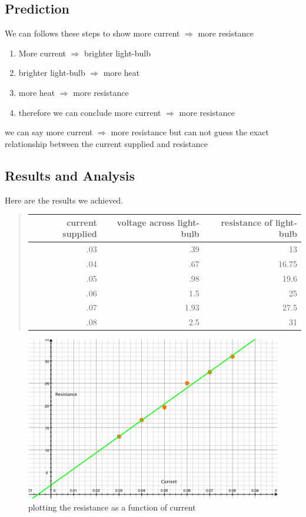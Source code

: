 \documentclass[12pt]{article}
\begin{document}
\subsection*{Prediction}
We can follows these steps to show more current $\Rightarrow$ more resistance

\begin{enumerate}
\item 
More current $\Rightarrow$ brighter light-bulb
\item 
brighter light-bulb $\Rightarrow$ more heat
\item 
more heat  $\Rightarrow$ more resistance
\item 
therefore we can conclude more current $\Rightarrow$ more resistance  
\end{enumerate}
we can say more current $\Rightarrow$ more resistance but can not guess the exact relationship between the current supplied and resistance


\subsection*{Results and Analysis}
Here are the results we achieved.  
\begin{quote}
	\begin{tabular}{|r|r|r|}
	\hline 
	current supplied & voltage across light-bulb & resistance of light-bulb \\
	\hline 
	.03 & .39 & 13 \\
	.04 & .67 & 16.75 \\
	.05 & .98 & 19.6 \\
	.06 & 1.5 & 25 \\
	.07 & 1.93 & 27.5 \\
	.08 & 2.5 & 31 \\
	\hline 
	\end{tabular}
\end{quote}
\begin{figure}[h]
	 \centering
	 \includegraphics[scale = .51]{graph1}
	 \caption{plotting the resistance as a function of current}
\end{figure}
\end{document}
